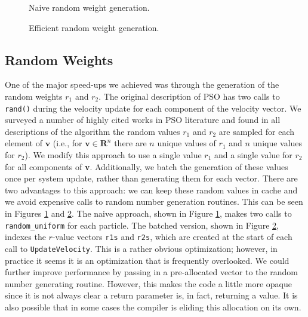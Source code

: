 \begin{figure}
  
  \caption{Naive random weight generation.}\label{fig:naive-par}
\end{figure}

\begin{figure}
  
  \caption{Efficient random weight generation.}\label{fig:efficient-par}
\end{figure}

\subsection{Random Weights}
One of the major speed-ups we achieved was through
the generation of the random weights $r_1$ and $r_2$. The original description of
PSO \cite{pso} has two calls to \texttt{rand()} during the velocity update for each
component of the velocity vector. We surveyed a number of highly cited works in
PSO literature \cite{pso-development, pso-overview} and found in
all descriptions of the algorithm the random values $r_1$ and $r_2$ are sampled
for each element of $\textbf{v}$ (i.e., for $\textbf{v}\in\mathbf{R}^n$ there
are $n$ unique values of $r_1$ and $n$ unique values for $r_2$). We modify this
approach to use a single value $r_1$ and a single value for $r_2$ for all
components of \textbf{v}. Additionally, we batch
the generation of these values once per system update, rather than generating
them for each vector.
There are two advantages to this approach: we can keep
these random values in cache and we avoid expensive calls to random number
generation routines. This can be seen in Figures \ref{fig:naive-par} and
\ref{fig:efficient-par}. The naive approach, shown in Figure \ref{fig:naive-par},
makes two calls to
\texttt{random\_uniform} for each particle. The batched version, shown in Figure
\ref{fig:efficient-par},
indexes the $r$-value vectors \texttt{r1s} and \texttt{r2s}, which are
created at the start of each call to \texttt{UpdateVelocity}. This is a rather
obvious optimization; however, in
practice it seems it is an optimization that is frequently overlooked.
We could further improve performance by passing in a pre-allocated vector to the
random number generating routine. However, this makes the code a little more
opaque since it is not always clear a return parameter is, in fact, returning a
value. It is also possible that in some cases the compiler is eliding
this allocation on its own.

